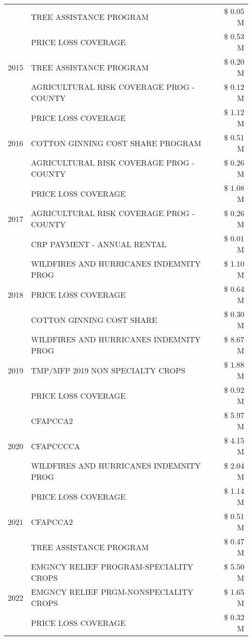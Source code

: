 \begin{tabular}{llr}
 & TREE ASSISTANCE PROGRAM & \$ 0.05 M \\
\cline{1-3}
\multirow[t]{3}{*}{2015} & PRICE LOSS COVERAGE & \$ 0.53 M \\
 & TREE ASSISTANCE PROGRAM & \$ 0.20 M \\
 & AGRICULTURAL RISK COVERAGE PROG - COUNTY & \$ 0.12 M \\
\cline{1-3}
\multirow[t]{3}{*}{2016} & PRICE LOSS COVERAGE & \$ 1.12 M \\
 & COTTON GINNING COST SHARE PROGRAM & \$ 0.51 M \\
 & AGRICULTURAL RISK COVERAGE PROG - COUNTY & \$ 0.26 M \\
\cline{1-3}
\multirow[t]{3}{*}{2017} & PRICE LOSS COVERAGE & \$ 1.08 M \\
 & AGRICULTURAL RISK COVERAGE PROG - COUNTY & \$ 0.26 M \\
 & CRP PAYMENT - ANNUAL RENTAL & \$ 0.01 M \\
\cline{1-3}
\multirow[t]{3}{*}{2018} & WILDFIRES AND HURRICANES INDEMNITY PROG & \$ 1.10 M \\
 & PRICE LOSS COVERAGE & \$ 0.64 M \\
 & COTTON GINNING COST SHARE & \$ 0.30 M \\
\cline{1-3}
\multirow[t]{3}{*}{2019} & WILDFIRES AND HURRICANES INDEMNITY PROG & \$ 8.67 M \\
 & TMP/MFP 2019 NON SPECIALTY CROPS & \$ 1.88 M \\
 & PRICE LOSS COVERAGE & \$ 0.92 M \\
\cline{1-3}
\multirow[t]{3}{*}{2020} & CFAPCCA2 & \$ 5.97 M \\
 & CFAPCCCCA & \$ 4.15 M \\
 & WILDFIRES AND HURRICANES INDEMNITY PROG & \$ 2.04 M \\
\cline{1-3}
\multirow[t]{3}{*}{2021} & PRICE LOSS COVERAGE & \$ 1.14 M \\
 & CFAPCCA2 & \$ 0.51 M \\
 & TREE ASSISTANCE PROGRAM & \$ 0.47 M \\
\cline{1-3}
\multirow[t]{3}{*}{2022} & EMGNCY RELIEF PROGRAM-SPECIALITY CROPS & \$ 5.50 M \\
 & EMGNCY RELIEF PRGM-NONSPECIALITY CROPS & \$ 1.65 M \\
 & PRICE LOSS COVERAGE & \$ 0.32 M \\
\cline{1-3}
\bottomrule
\end{tabular}
